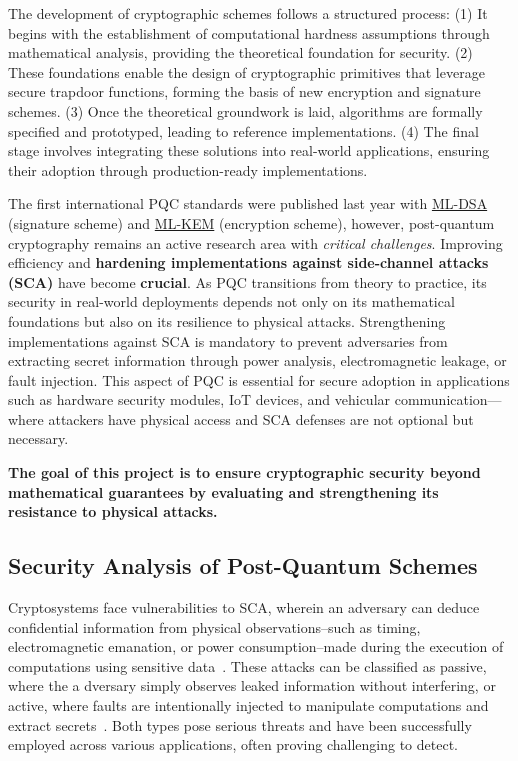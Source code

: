 \documentclass[11pt, a4paper]{article}
\begin{document}
The development of cryptographic schemes follows a structured process: (1) It begins with the establishment of computational hardness assumptions through 
mathematical analysis, providing the theoretical foundation for security.
(2) These foundations enable the design of cryptographic primitives that leverage secure trapdoor functions, 
forming the basis of new encryption and signature schemes.
(3) Once the theoretical groundwork is laid, algorithms are formally specified and prototyped, leading to 
reference implementations. 
(4) The final stage involves integrating these solutions into real-world applications, ensuring their adoption 
through production-ready implementations.


The first international PQC standards were published last year
with \href{https://csrc.nist.gov/pubs/fips/204/final}{ML-DSA} 
(signature scheme) and \href{https://csrc.nist.gov/pubs/fips/203/final}{ML-KEM} 
(encryption scheme), 
however, post-quantum cryptography remains an 
active research area with \emph{critical challenges}. 
Improving efficiency and \textbf{hardening implementations against side-channel attacks (SCA)} 
have become \textbf{crucial}. As PQC transitions from theory to practice, 
its security in real-world deployments depends not 
only on its mathematical foundations but also on its 
resilience to physical attacks. Strengthening implementations against 
SCA is mandatory to prevent adversaries from extracting secret 
information through power analysis, electromagnetic leakage, or 
fault injection. This aspect of PQC is essential for secure adoption 
in applications such as hardware security modules, IoT devices, and 
vehicular communication---where attackers have physical access and 
SCA defenses are not optional but necessary.

\textbf{The goal of this project is to ensure cryptographic security beyond mathematical 
guarantees by evaluating and strengthening its resistance to physical attacks.}

\subsection*{Security Analysis of Post-Quantum Schemes}\label{sec:an}\vspace{-0.1cm}

Cryptosystems face vulnerabilities to SCA, wherein an adversary can deduce 
confidential information from physical observations--such as timing,
electromagnetic emanation, or power consumption--made during the execution of 
computations using sensitive data~\cite{brumley2005remote, KocherJJR11,10.1007/3-540-48405-1_25}.
These attacks can be classified as passive, where the a
dversary simply observes leaked information without interfering, or active, 
where faults are intentionally injected to manipulate computations and extract 
secrets~\cite{4599557,6076462}. Both types pose serious threats and have been successfully employed 
across various applications, often proving challenging to detect.
\end{document}
